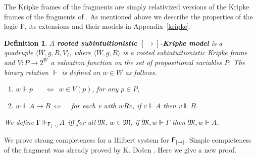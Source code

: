 \documentclass[12pt]{article}
\newtheorem{dfn}[thm]{Definition}
\begin{document}
The Kripke frames  of the fragments are simply relativized versions of the Kripke frames  of the fragments of \cite{Dic, Co}. As mentioned above we describe the properties of the logic {\sf F}, its extensions and their models in Appendix~\ref{kripke}.


\begin{dfn}\label{Frr}
 A \textbf{rooted subintuitionistic $[\rightarrow]$-Kripke model} is a quadruple $ \langle W, g, R, V \rangle $, where  $ \langle W, g, R \rangle $ is a rooted subintuitionistic Kripke frame and $ V:P\rightarrow 2^{W} $  a valuation function on the set of propositional variables $P$. The binary relation $ \Vdash $ is defined on $ w \in W $ as follows.
\begin{enumerate}
\item $ w \Vdash p~~~~~~~~\Leftrightarrow ~ ~w \in V(p) $, for any $ p \in P $,



\item  $w \Vdash A\rightarrow B  ~\Leftrightarrow$ ~ for each v with $w R v$, if $v \Vdash A$ then $v \Vdash B$.
\end{enumerate}
We define $\Gamma\Vdash_{{\sf F_{[\rightarrow]}} }\! A$ iff for all $ \mathfrak{M}$, $ w \in \mathfrak{M}$, if $\mathfrak{M}, w\Vdash \Gamma  $ then $\mathfrak{M}, w\Vdash A  $.
\end{dfn}

We prove strong completeness for a Hilbert system for $ {\sf F_{[\rightarrow]}}  $. Simple completeness of the fragment was already proved by K. Do\v{s}en \cite{Dosen}. Here we give a new proof.

\end{document}
